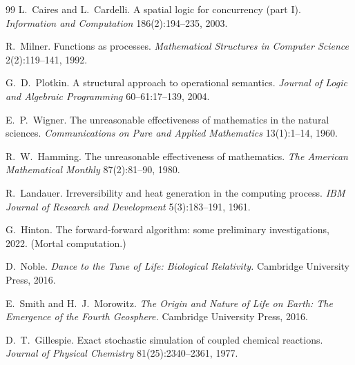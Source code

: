 \documentclass[11pt]{article}
\theoremstyle{plain}
\theoremstyle{definition}
\begin{document}
\begin{thebibliography}{99}
 L.\ Caires and L.\ Cardelli. A spatial logic for concurrency (part I).
\emph{Information and Computation} 186(2):194--235, 2003.

 R.\ Milner. Functions as processes. \emph{Mathematical Structures in Computer
Science} 2(2):119--141, 1992.

 G.\ D.\ Plotkin. A structural approach to operational semantics. \emph{Journal of
Logic and Algebraic Programming} 60--61:17--139, 2004.

 E.\ P.\ Wigner. The unreasonable effectiveness of mathematics in the natural
sciences. \emph{Communications on Pure and Applied Mathematics} 13(1):1--14, 1960.

 R.\ W.\ Hamming. The unreasonable effectiveness of mathematics. \emph{The American
Mathematical Monthly} 87(2):81--90, 1980.

 R.\ Landauer. Irreversibility and heat generation in the computing process.
\emph{IBM Journal of Research and Development} 5(3):183--191, 1961.

 G.\ Hinton. The forward-forward algorithm: some preliminary investigations, 2022.
(Mortal computation.)

 D.\ Noble. \emph{Dance to the Tune of Life: Biological Relativity.} Cambridge
University Press, 2016.

 E.\ Smith and H.\ J.\ Morowitz. \emph{The Origin and Nature of Life
on Earth: The Emergence of the Fourth Geosphere.} Cambridge University Press, 2016.

 D.\ T.\ Gillespie. Exact stochastic simulation of coupled chemical reactions.
\emph{Journal of Physical Chemistry} 81(25):2340--2361, 1977.

\end{thebibliography}
\end{document}
